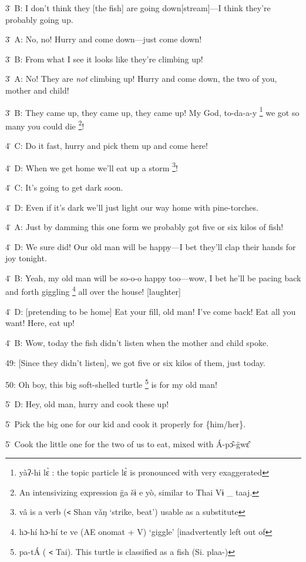 3\. B: I don't think they [the fish] are going down[stream]---I think they're probably
going up.

3\. A: No, no! Hurry and come down---just come down!

3\. B: From what I see it looks like they're climbing up!

3\. A: No! They are \textit{not} climbing up! Hurry and come down, the two of you,
mother and child!

3\. B: They came up, they came up, they came up! My God, to-da-a-y \footnote{yàʔ-hi lɛ̀ : the topic particle lɛ̀ is pronounced with very exaggerated} we got
so many you could die \footnote{An intensivizing expression g̈a  šɨ  e  yò, similar to Thai Vɨ \_ taaj.}!

4\. C: Do it fast, hurry and pick them up and come here!

4\. D: When we get home we'll eat up a storm \footnote{vâ is a verb (\texttt{<} Shan vǎŋ `strike, beat') usable as a substitute}!

4\. C: It's going to get dark soon.

4\. D: Even if it's dark we'll just light our way home with pine-torches.

4\. A: Just by damming this one form we probably got five or six kilos of fish!

4\. D: We sure did! Our old man will be happy---I bet they'll clap their hands
for joy tonight.

4\. B: Yeah, my old man will be so-o-o happy too---wow, I bet he'll be pacing back
and forth giggling \footnote{hɔ-hí hɔ-hí te ve (AE onomat + V) `giggle' [inadvertently left out of} all over the house! [laughter]

4\. D: [pretending to be home] Eat your fill, old man! I've come back! Eat all
you want! Here, eat up!

4\. B: Wow, today the fish didn't listen when the mother and child spoke.

49: [Since they didn't listen], we got five or six kilos of them, just today.

50: Oh boy, this big soft-shelled turtle \footnote{pa-tÁ ( \texttt{<} Tai). This turtle is classified as a fish (Si. plaa-)} is for my old man!

5\. D: Hey, old man, hurry and cook these up!

5\. Pick the big one for our kid and cook it properly for \{him/her\}.

5\. Cook the little one for the two of us to eat, mixed with Á-pɔ̂-g̈wɛ̂

